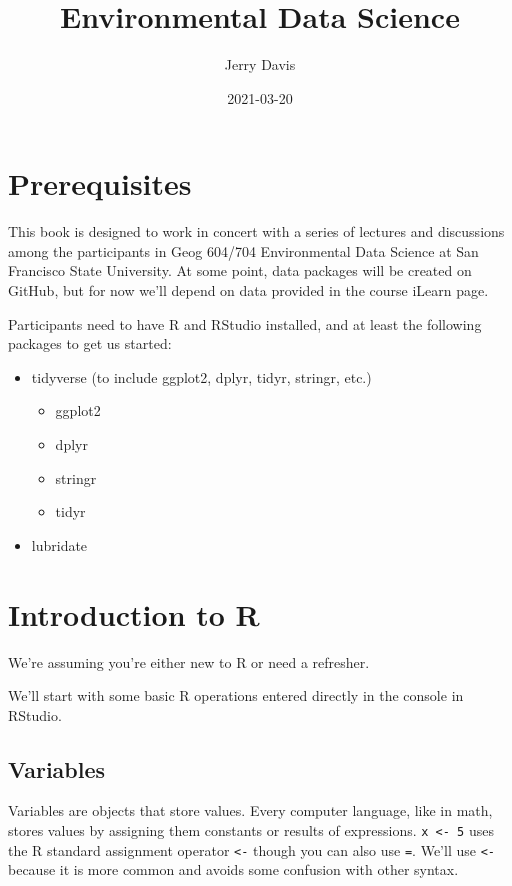 \documentclass[
]{book}
\title{Environmental Data Science}
\author{Jerry Davis}
\date{2021-03-20}
\providecommand{\tightlist}{%
  \setlength{\itemsep}{0pt}\setlength{\parskip}{0pt}}
\begin{document}
\maketitle

{
\setcounter{tocdepth}{1}
\tableofcontents
}
\hypertarget{prerequisites}{%
\chapter{Prerequisites}\label{prerequisites}}

This book is designed to work in concert with a series of lectures and discussions among the participants in Geog 604/704 Environmental Data Science at San Francisco State University. At some point, data packages will be created on GitHub, but for now we'll depend on data provided in the course iLearn page.

Participants need to have R and RStudio installed, and at least the following packages to get us started:

\begin{itemize}
\tightlist
\item
  tidyverse (to include ggplot2, dplyr, tidyr, stringr, etc.)

  \begin{itemize}
  \tightlist
  \item
    ggplot2
  \item
    dplyr
  \item
    stringr
  \item
    tidyr
  \end{itemize}
\item
  lubridate
\end{itemize}

\hypertarget{introduction-to-r}{%
\chapter{Introduction to R}\label{introduction-to-r}}

We're assuming you're either new to R or need a refresher.

We'll start with some basic R operations entered directly in the console in RStudio.

\hypertarget{variables}{%
\section{Variables}\label{variables}}

Variables are objects that store values. Every computer language, like in math, stores
values by assigning them constants or results of expressions.
\texttt{x\ \textless{}-\ 5} uses the R standard assignment operator \texttt{\textless{}-} though you can also use \texttt{=}.
We'll use \texttt{\textless{}-} because it is more common and avoids some confusion with other syntax.
\end{document}
